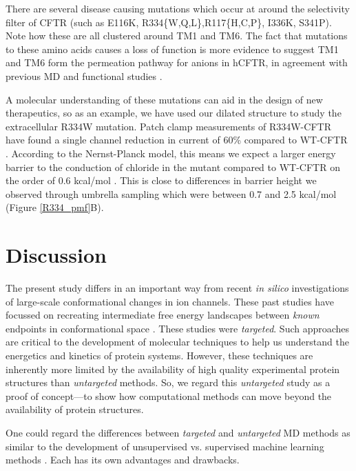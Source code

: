 There are several disease causing mutations which occur at around the selectivity filter of CFTR (such as E116K, R334\{W,Q,L\},R117\{H,C,P\}, I336K, S341P)\cite{cftr2}. Note how these are all clustered around TM1 and TM6. The fact that mutations to these amino acids causes a loss of function is more evidence to suggest TM1 and TM6 form the permeation pathway for anions in hCFTR, in agreement with previous MD and functional studies \cite{zeng2021,farkas2020, linsdell2016, linsdell2018}. 

A molecular understanding of these mutations can aid in the design of new therapeutics, so as an example, we have used our dilated structure to study the extracellular R334W mutation. Patch clamp measurements of R334W-CFTR have found a single channel reduction in current of 60\% compared to WT-CFTR \cite{gong2004}. According to the Nernst-Planck model, this means we expect a larger energy barrier to the conduction of chloride in the mutant compared to WT-CFTR on the order of 0.6 kcal/mol \cite{kuyucak2001}. This is close to differences in barrier height we observed through umbrella sampling which were between 0.7 and 2.5 kcal/mol (Figure \ref{R334_pmf}B). 

\section{Discussion}

The present study differs in an important way from recent \textit{in silico} investigations of large-scale conformational changes in ion channels. These past studies have focussed on recreating intermediate free energy landscapes between \textit{known} endpoints in conformational space \cite{lev2020, bergh2021, moradi2015}. These studies were \textit{targeted}. Such approaches are critical to the development of molecular techniques to help us understand the energetics and kinetics of protein systems. However, these techniques are inherently more limited by the availability of high quality experimental protein structures than \textit{untargeted} methods. So, we regard this \textit{untargeted} study as a proof of concept---to show how computational methods can move beyond the availability of protein structures.

One could regard the differences between \textit{targeted} and \textit{untargeted} MD methods as similar to the development of unsupervised vs. supervised machine learning methods \cite{grus2015}. Each has its own advantages and drawbacks.

